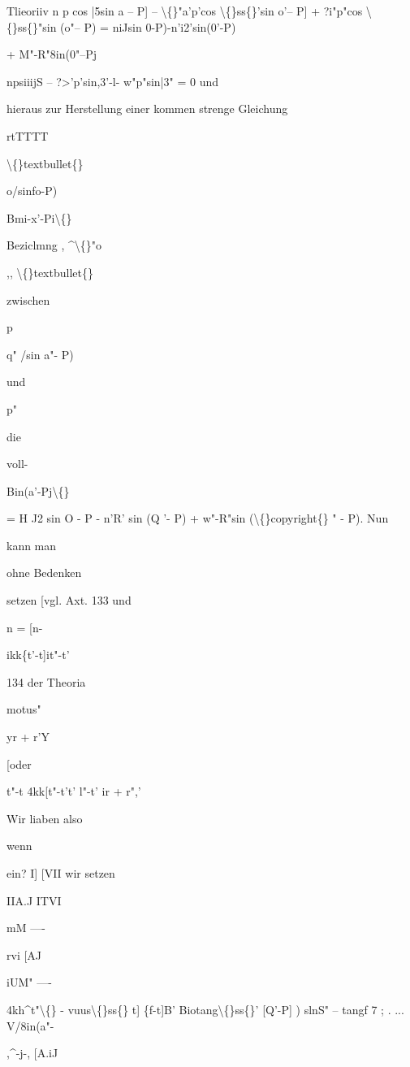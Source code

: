 \documentclass[10pt,a4paper]{article}
\begin{document}
Tlieoriiv
n p cos |5sin a -- P] -- \textbackslash\{\}"a'p'cos \textbackslash\{\}ss\{\}'sin o'-- P] + ?i"p"cos \textbackslash\{\}ss\{\}"sin (o"-- P)
= niJsin 0-P)-n'i2'sin(0'-P)

+ M"-R"8in(0"--Pj

npsiiijS -- ?>'p'sin,3'-l- w"p"sin|3" = 0
und

hieraus
zur Herstellung einer
kommen strenge Gleichung

rtTTTT

\textbackslash\{\}textbullet\{\}

o/sinfo-P)

Bmi-x'-Pi\textbackslash\{\}

Beziclmng
, \textasciicircum{}\textbackslash\{\}"o

,, \textbackslash\{\}textbullet\{\}

zwischen

p

q" /sin a"- P)

und

p"

die

voll-

Bin(a'-Pj\textbackslash\{\}

= H J2 sin O - P - n'R' sin (Q '- P) + w"-R"sin (\textbackslash\{\}copyright\{\} " - P).
Nun

kann man

ohne Bedenken

setzen [vgl. Axt. 133 und

n = [n-

ikk\{t'-t]it"-t'

134 der Theoria

motus"

yr + r'Y

[oder

t"-t
4kk[t"-t't'
l"-t'
ir + r",'

Wir liaben also

wenn

ein?
I]
[VII
wir setzen

IIA.J
ITVI

mM ----

rvi
[AJ

iUM" ----

4kh\textasciicircum{}t"\textbackslash\{\} - vuus\textbackslash\{\}ss\{\}
t] \{f-t]B' Biotang\textbackslash\{\}ss\{\}'
[Q'-P] )
slnS"
-- tangf
7
;
. ... V/8in(a"-

,\textasciicircum{}-j-,
[A.iJ
\end{document}
